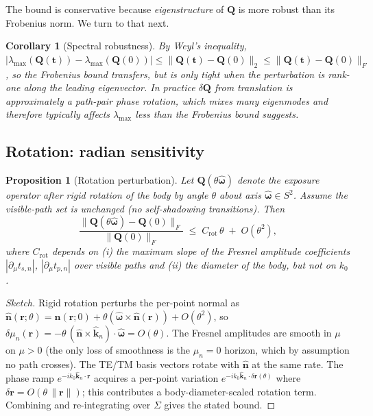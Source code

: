 \documentclass[11pt,a4paper]{article}
\newtheorem{proposition}[theorem]{Proposition}
\newtheorem{corollary}[theorem]{Corollary}
\theoremstyle{definition}
\newcommand{\rr}{\mathbf{r}}
\newcommand{\nh}{\hat{\mathbf{n}}}
\newcommand{\kh}{\hat{\mathbf{k}}}
\newcommand{\Q}{\mathbf{Q}}
\newcommand{\Sigmaset}{\Sigma}
\newcommand{\lammax}{\lambda_{\max}}
\begin{document}
The bound is conservative because \emph{eigenstructure} of $\Q$ is more
robust than its Frobenius norm. We turn to that next.

\begin{corollary}[Spectral robustness]
\label{cor:spectral}
By Weyl's inequality,
$|\lammax(\Q(\mathbf{t})) - \lammax(\Q(0))|
 \le \|\Q(\mathbf{t})-\Q(0)\|_2 \le \|\Q(\mathbf{t})-\Q(0)\|_F$,
so the Frobenius bound transfers, but is only tight when the perturbation
is rank-one along the leading eigenvector. In practice $\delta\Q$ from
translation is approximately a path-pair phase rotation, which mixes
many eigenmodes and therefore typically affects $\lammax$ less than the
Frobenius bound suggests.
\end{corollary}

\subsection{Rotation: radian sensitivity}

\begin{proposition}[Rotation perturbation]
\label{prop:rotation}
Let $\Q(\theta\hat{\boldsymbol{\omega}})$ denote the exposure operator
after rigid rotation of the body by angle $\theta$ about axis
$\hat{\boldsymbol{\omega}}\in S^2$. Assume the visible-path set is
unchanged (no self-shadowing transitions). Then
\begin{equation}
  \frac{\|\Q(\theta\hat{\boldsymbol{\omega}})-\Q(0)\|_F}{\|\Q(0)\|_F}
  \;\le\; C_{\mathrm{rot}}\,\theta \;+\; O(\theta^2),
\end{equation}
where $C_{\mathrm{rot}}$ depends on
(i) the maximum slope of the Fresnel amplitude coefficients
$|\partial_\mu t_{s,n}|$, $|\partial_\mu t_{p,n}|$ over visible paths
and (ii) the diameter of the body, but not on $k_0$.
\end{proposition}

\begin{proof}[Sketch]
Rigid rotation perturbs the per-point normal as
$\nh(\rr;\theta)=\nh(\rr;0)+\theta(\hat{\boldsymbol{\omega}}\times\nh(\rr))+O(\theta^2)$,
so $\delta\mu_n(\rr)=-\theta\,(\nh\times\kh_n)\cdot\hat{\boldsymbol{\omega}} = O(\theta)$.
The Fresnel amplitudes are smooth in $\mu$ on $\mu>0$ (the only loss of
smoothness is the $\mu_n=0$ horizon, which by assumption no path crosses).
The TE/TM basis vectors rotate with $\nh$ at the same rate.
The phase ramp $e^{-ik_0\kh_n\cdot\rr}$ acquires a per-point variation
$e^{-ik_0\kh_n\cdot\delta\rr(\theta)}$ where $\delta\rr=O(\theta\,\|\rr\|)$;
this contributes a body-diameter-scaled rotation term. Combining and
re-integrating over $\Sigmaset$ gives the stated bound.
\end{proof}
\end{document}
